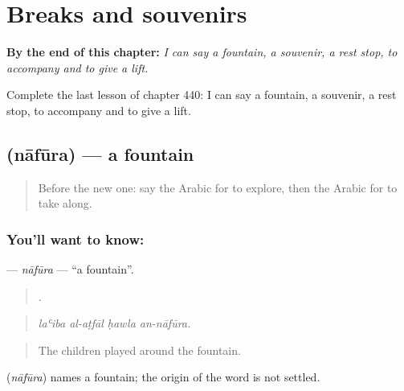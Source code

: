 
\chapter{Breaks and souvenirs}
\label{ch:ar-breaks-and-souvenirs}

\begin{chapteropening}
\textbf{By the end of this chapter:} \emph{I can say a fountain, a souvenir, a rest stop, to accompany and to give a lift.}

Complete the last lesson of chapter 440: I can say a fountain, a souvenir, a rest stop, to accompany and to give a lift.
\end{chapteropening}

\section[\texorpdfstring{\ar{نافورة} (nāfūra)}{نافورة (nāfūra)}]{ (nāfūra) — a fountain}

\label{lesson:AR-C440-nafura}



\begin{quote}
Before the new one: say the Arabic for to explore, then the Arabic for to take along.
\end{quote}

\subsection*{You'll want to know: }
\textbf{} — \emph{nāfūra} — \textquotedblleft{}a fountain\textquotedblright{}.

\begin{quote}
   .
\end{quote}

\begin{quote}
\emph{laʿiba al-aṭfāl ḥawla an-nāfūra.}
\end{quote}

\begin{quote}
The children played around the fountain.
\end{quote}

\begin{cousinweb}
\textbf{} (\emph{nāfūra}) names a fountain; the origin of the word is not settled.
\end{cousinweb}

